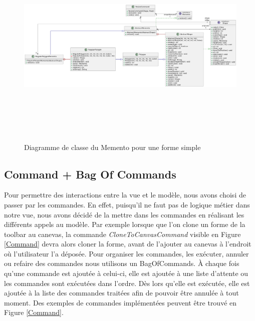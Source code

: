 \documentclass{article}
\begin{document}
\begin{figure}[h]
    \centering
    \includegraphics[width=\textwidth,height=10.0cm,keepaspectratio]{memento2.png}
    \caption{Diagramme de classe du Memento pour une forme simple}
    \label{MementoShape}
\end{figure}
\FloatBarrier

\subsection{Command + Bag Of Commands} \label{BoC}

Pour permettre des interactions entre la vue et le modèle, nous avons choisi de passer par les commandes. En effet,
puisqu'il ne faut pas de logique métier dans notre vue, nous avons décidé de la mettre dans les commandes en réalisant 
les différents appels au modèle. Par exemple lorsque que l'on clone un forme de la toolbar
au canevas, la commande \textit{CloneToCanvasCommand} visible en Figure \ref{Command} devra alors cloner la forme, avant de
l'ajouter au canevas à l'endroit où l'utilisateur l'a déposée. Pour organiser les commandes, les exécuter, annuler ou refaire des commandes
 nous utilisons un BagOfCommands. À chaque fois qu'une commande est ajoutée à celui-ci, elle est ajoutée à une liste d'attente ou les commandes 
 sont exécutées dans l'ordre. Dès lors qu'elle est exécutée, elle est ajoutée à la liste des commandes traitées afin de pouvoir être annulée à tout 
 moment. Des exemples de commandes implémentées peuvent être trouvé en Figure \ref{Command}.
\end{document}
